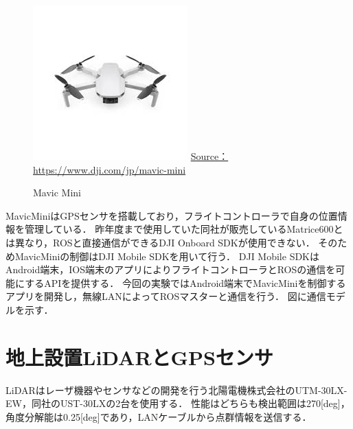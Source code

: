 \documentclass[autodetect-engine,dvipdfmx-if-dvi,ja=standard,a4j,jbase=11pt,magstyle=nomag*]{bxjsreport}
\begin{document}
\begin{figure}[t]
    \centering
    \includegraphics[width=0.9\linewidth, clip]{./figure/chapter4/mavic_mini.jpg}
    \url{Source：https://www.dji.com/jp/mavic-mini}
    \caption{Mavic Mini}
    \label{fig:mavic_mini}
\end{figure}

MavicMiniはGPSセンサを搭載しており，フライトコントローラで自身の位置情報を管理している．
昨年度まで使用していた同社が販売しているMatrice600とは異なり，ROSと直接通信ができるDJI Onboard SDKが使用できない．
そのためMavicMiniの制御はDJI Mobile SDKを用いて行う．
DJI Mobile SDKはAndroid端末，IOS端末のアプリによりフライトコントローラとROSの通信を可能にするAPIを提供する．
今回の実験ではAndroid端末でMavicMiniを制御するアプリを開発し，無線LANによってROSマスターと通信を行う．
図に通信モデルを示す．



\section{地上設置LiDARとGPSセンサ}
LiDARはレーザ機器やセンサなどの開発を行う北陽電機株式会社のUTM-30LX-EW，同社のUST-30LXの2台を使用する．
性能はどちらも検出範囲は270[deg]，角度分解能は0.25[deg]であり，LANケーブルから点群情報を送信する．
\end{document}
